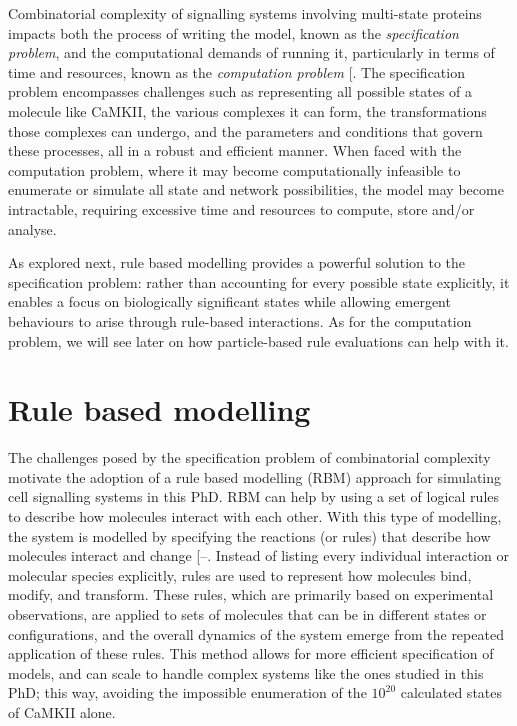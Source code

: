 \documentclass[
  11pt,
  letterpaper,
]{scrreprt}
\begin{document}
Combinatorial complexity of signalling systems involving multi-state
proteins impacts both the process of writing the model, known as the
\emph{specification problem}, and the computational demands of running
it, particularly in terms of time and resources, known as the
\emph{computation problem}
{[}\citeproc{ref-stefan2014Multistate}{282}{]}. The specification
problem encompasses challenges such as representing all possible states
of a molecule like CaMKII, the various complexes it can form, the
transformations those complexes can undergo, and the parameters and
conditions that govern these processes, all in a robust and efficient
manner. When faced with the computation problem, where it may become
computationally infeasible to enumerate or simulate all state and
network possibilities, the model may become intractable, requiring
excessive time and resources to compute, store and/or analyse.

As explored next, rule based modelling provides a powerful solution to
the specification problem: rather than accounting for every possible
state explicitly, it enables a focus on biologically significant states
while allowing emergent behaviours to arise through rule-based
interactions. As for the computation problem, we will see later on how
particle-based rule evaluations can help with it.

\section{Rule based modelling}\label{rule-based-modelling}

The challenges posed by the specification problem of combinatorial
complexity motivate the adoption of a rule based modelling (RBM)
approach for simulating cell signalling systems in this PhD. RBM can
help by using a set of logical rules to describe how molecules interact
with each other. With this type of modelling, the system is modelled by
specifying the reactions (or rules) that describe how molecules interact
and change
{[}--\citeproc{ref-chylek2015Modeling}{288}{]}.
Instead of listing every individual interaction or molecular species
explicitly, rules are used to represent how molecules bind, modify, and
transform. These rules, which are primarily based on experimental
observations, are applied to sets of molecules that can be in different
states or configurations, and the overall dynamics of the system emerge
from the repeated application of these rules. This method allows for
more efficient specification of models, and can scale to handle complex
systems like the ones studied in this PhD; this way, avoiding the
impossible enumeration of the \(10^{20}\) calculated states of CaMKII
alone.
\end{document}
